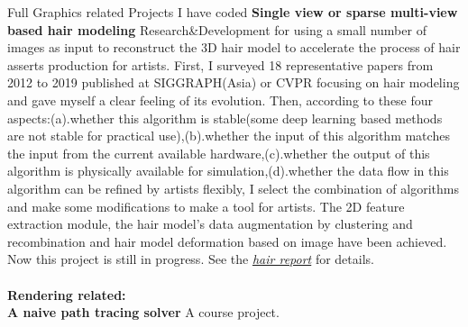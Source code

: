 \documentclass{article} %
\begin{document}
\begin{section}{Full Graphics related Projects I have coded}
               {\bf Single view or sparse multi-view based hair modeling} Research\&Development for using a small number of images as input to reconstruct the 3D hair model to accelerate the process of hair asserts production for artists. First, I surveyed 18 representative papers from 2012 to 2019 published at SIGGRAPH(Asia) or CVPR focusing on hair modeling and gave myself a clear feeling of its evolution. Then, according to these four aspects:(a).whether this algorithm is stable(some deep learning based methods are not stable for practical use),(b).whether the input of this algorithm matches the input from the current available hardware,(c).whether the output of this algorithm is physically available for simulation,(d).whether the data flow in this algorithm can be refined by artists flexibly, I select the combination of algorithms and make some modifications to make a tool for artists. The 2D feature extraction module, the hair model's data augmentation by clustering and recombination and hair model deformation based on image have been achieved. Now this project is still in progress. See the \emph{\href{https://wtyatzoo.github.io/reports/hair.pdf}{hair report}} for details. \\ \\
        \textbf{Rendering related:}\\
               {\bf A naive path tracing solver} A course project. \\               
\end{section}
 

\end{document}
